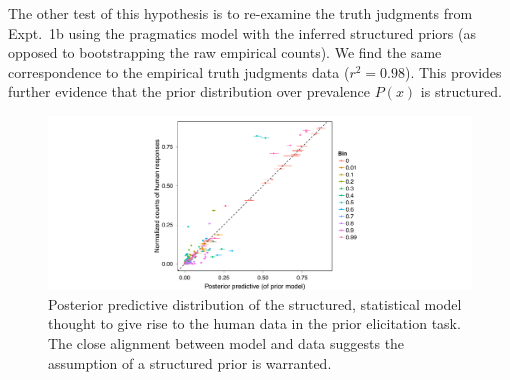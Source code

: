 \documentclass[12pt,letterpaper]{article}
\newcommand{\mht}[1]{\textcolor{Blue}{[mht: #1]}}
\begin{document}
The other test of this hypothesis is to re-examine the truth judgments from Expt.~1b using the pragmatics model with the inferred structured priors (as opposed to bootstrapping the raw empirical counts). 
We find the same correspondence to the empirical truth judgments data ($r^2 = 0.98$).
This provides further evidence that the prior distribution over prevalence $P(x)$ is structured.


\begin{figure}
\centering
    \includegraphics[width=0.6\columnwidth]{postPred-priorModel.pdf}
    \caption{Posterior predictive distribution of the structured, statistical model thought to give rise to the human data in the prior elicitation task. The close alignment between model and data suggests the assumption of a structured prior is warranted.}
  \label{fig:pp-priorModel}
\end{figure}


\end{document}
